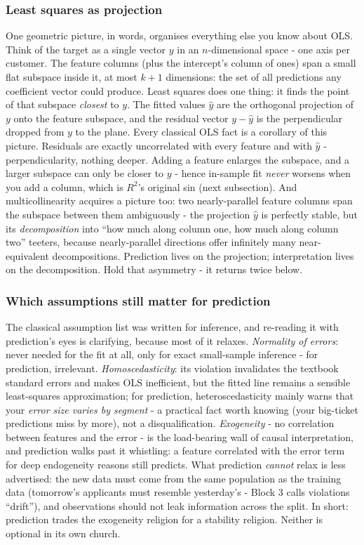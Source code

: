 \documentclass[11pt,a4paper]{article}
\begin{document}
\subsubsection{Least squares as projection}
One geometric picture, in words, organises everything else you know
about OLS. Think of the target as a single vector $y$ in an
$n$-dimensional space - one axis per customer. The feature columns
(plus the intercept's column of ones) span a small flat subspace inside
it, at most $k+1$ dimensions: the set of all predictions any coefficient
vector could produce. Least squares does one thing: it finds the point
of that subspace \emph{closest} to $y$. The fitted values $\hat y$ are
the orthogonal projection of $y$ onto the feature subspace, and the
residual vector $y - \hat y$ is the perpendicular dropped from $y$ to
the plane. Every classical OLS fact is a corollary of this picture.
Residuals are exactly uncorrelated with every feature and with $\hat y$
- perpendicularity, nothing deeper. Adding a feature enlarges the
subspace, and a larger subspace can only be closer to $y$ - hence
in-sample fit \emph{never} worsens when you add a column, which is
$R^2$'s original sin (next subsection). And multicollinearity acquires a
picture too: two nearly-parallel feature columns span the subspace
between them ambiguously - the projection $\hat y$ is perfectly stable,
but its \emph{decomposition} into ``how much along column one, how much
along column two'' teeters, because nearly-parallel directions offer
infinitely many near-equivalent decompositions. Prediction lives on the
projection; interpretation lives on the decomposition. Hold that
asymmetry - it returns twice below.

\subsubsection{Which assumptions still matter for prediction}
The classical assumption list was written for inference, and re-reading
it with prediction's eyes is clarifying, because most of it relaxes.
\emph{Normality of errors}: never needed for the fit at all, only for
exact small-sample inference - for prediction, irrelevant.
\emph{Homoscedasticity}: its violation invalidates the textbook standard
errors and makes OLS inefficient, but the fitted line remains a
sensible least-squares approximation; for prediction, heteroscedasticity
mainly warns that your \emph{error size varies by segment} - a
practical fact worth knowing (your big-ticket predictions miss by more),
not a disqualification. \emph{Exogeneity} - no correlation between
features and the error - is the load-bearing wall of causal
interpretation, and prediction walks past it whistling: a feature
correlated with the error term for deep endogeneity reasons still
predicts. What prediction \emph{cannot} relax is less advertised: the
new data must come from the same population as the training data
(tomorrow's applicants must resemble yesterday's - Block 3 calls
violations ``drift''), and observations should not leak information
across the split. In short: prediction trades the exogeneity religion
for a stability religion. Neither is optional in its own church.
\end{document}
